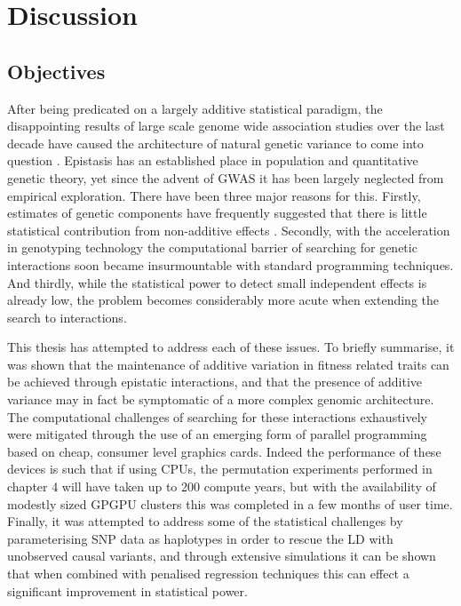 \chapter{Discussion}
\label{Discussion}


\section{Objectives}

After being predicated on a largely additive statistical paradigm, the disappointing results of large scale genome wide association studies over the last decade have caused the architecture of natural genetic variance to come into question \citep{Eichler2010}. Epistasis has an established place in population and quantitative genetic theory, yet since the advent of GWAS it has been largely neglected from empirical exploration. There have been three major reasons for this. Firstly, estimates of genetic components have frequently suggested that there is little statistical contribution from non-additive effects \citep{Hill2008a}. Secondly, with the acceleration in genotyping technology the computational barrier of searching for genetic interactions soon became insurmountable with standard programming techniques. And thirdly, while the statistical power to detect small independent effects is already low, the problem becomes considerably more acute when extending the search to interactions.

This thesis has attempted to address each of these issues. To briefly summarise, it was shown that the maintenance of additive variation in fitness related traits can be achieved through epistatic interactions, and that the presence of additive variance may in fact be symptomatic of a more complex genomic architecture. The computational challenges of searching for these interactions exhaustively were mitigated through the use of an emerging form of parallel programming based on cheap, consumer level graphics cards. Indeed the performance of these devices is such that if using CPUs, the permutation experiments performed in chapter 4 will have taken up to 200 compute years, but with the availability of modestly sized GPGPU clusters this was completed in a few months of user time. Finally, it was attempted to address some of the statistical challenges by parameterising SNP data as haplotypes in order to rescue the LD with unobserved causal variants, and through extensive simulations it can be shown that when combined with penalised regression techniques this can effect a significant improvement in statistical power.


